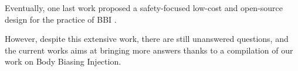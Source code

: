 		Eventually, one last work proposed a safety-focused low-cost and open-source design for the practice of BBI \cite{colinFdtc2023}.

		However, despite this extensive work, there are still unanswered questions, and the current works aims at bringing more answers thanks to a compilation of our work on Body Biasing Injection.


%
%		
%

